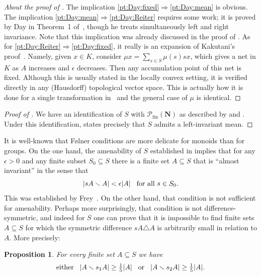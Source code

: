 \documentclass[12pt, pdflatex]{amsart}
\newtheorem{proposition}[theorem]{Proposition}
\theoremstyle{definition}
\numberwithin{equation}{section}
\numberwithin{theorem}{section}
\newcommand{\NN}{\mathbf{N}}
\newcommand{\sPf}{\mathscr{P}_\mathrm{fin}}
\begin{document}
\begin{proof}[About the proof of ]
The implication \eqref{pt:Day:fixed}$\Longrightarrow$\eqref{pt:Day:mean} is obvious. The implication \eqref{pt:Day:mean}$\Longrightarrow$\eqref{pt:Day:Reiter} requires some work; it is proved by Day in Theorem~1 of~\cite[\S5]{Day57}, though he treats simultaneously left and right invariance. Note that this implication was already discussed in the proof of . As for \eqref{pt:Day:Reiter}$\Longrightarrow$\eqref{pt:Day:fixed}, it really is an expansion of Kakutani's proof~\cite{Kakutani38}. Namely, given $x\in K$, consider  $\mu x = \sum_{s\in S} \mu(s) s x$, which gives a net in $K$ as $A$ increases and $\epsilon$ decreases. Then any accumulation point of this net is fixed. Although this is usually stated in the locally convex setting, it is verified directly in any (Hausdorff) topological vector space. This is actually how it is done for a single transformation in~\cite[V.10.6]{Dunford-Schwartz_I} and the general case of $\mu$ is identical.
\end{proof}

\begin{proof}[Proof of ]
We have an identification of $S$ with $\sPf(\NN)$ as described by  and . Under this identification,  states precisely that $S$ admits a left-invariant mean.
\end{proof}

It is well-known that F\o lner conditions are more delicate for monoids than for groups. On the one hand, the amenability of $S$ established in  implies that for any $\epsilon>0$ and any finite subset $S_0\subseteq S$ there is a finite set $A\subseteq S$ that is ``almost invariant'' in the sense that
\begin{equation*}
|s A \smallsetminus A| < \epsilon |A| \kern3mm \text{for all }s\in S_0.     
\end{equation*}
This was established by Frey~\cite[\S6]{FreyPhD}. On the other hand, that condition is not sufficient for amenability. Perhaps more surprisingly, that condition is not difference-symmetric, and indeed for $S$ one can prove that it is impossible to find finite sets $A\subseteq S$ for which the symmetric difference $s A \triangle A$ is arbitrarily small in relation to $A$. More precisely:

\begin{proposition}
For every finite set $A\subseteq S$ we have
\begin{equation*}
\text{either}\kern3mm |A \smallsetminus s_1 A|\geq \tfrac15 |A| \kern3mm \text{or} \kern3mm |A \smallsetminus s_2 A|\geq \tfrac15 |A|.
\end{equation*}
\end{proposition}
\end{document}
